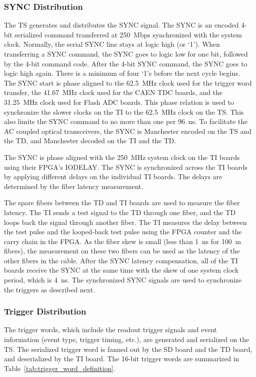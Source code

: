 \subsubsection{SYNC Distribution}

The TS generates and distributes the SYNC signal.  The SYNC is an encoded 4-bit serialized command transferred at 250~Mbps synchronized with the system clock.  Normally, the serial SYNC line stays at logic high (or ‘1’).  When transferring a SYNC command, the SYNC goes to logic low for one bit, followed by the 4-bit command code.  After the 4-bit SYNC command, the SYNC goes to logic high again.  There is a minimum of four ‘1’s before the next cycle begins.  The SYNC start is phase aligned to the 62.5~MHz clock used for the trigger word transfer, the 41.67~MHz clock used for the CAEN TDC boards, and the 31.25~MHz clock used for Flash ADC boards.  This phase relation is used to synchronize the slower clocks on the TI to the 62.5~MHz clock on the TS.  This also limits the SYNC command to no more than one per 96~ns.  To facilitate the AC coupled optical transceivers, the SYNC is Manchester encoded on the TS and the TD, and Manchester decoded on the TI and the TD.

The SYNC is phase aligned with the 250~MHz system clock on the TI boards using their FPGA’s IODELAY.  The SYNC is synchronized across the TI boards by applying different delays on the individual TI boards.  The delays are determined by the fiber latency measurement.  

The spare fibers between the TD and TI boards are used to measure the fiber latency.  The TI sends a test signal to the TD through one fiber, and the TD loops back the signal through another fiber.  The TI measures the delay between the test pulse and the looped-back test pulse using the FPGA counter and the carry chain in the FPGA.  As the fiber skew is small (less than 1~ns for 100~m fibers), the measurement on these two fibers can be used as the latency of the other fibers in the cable.  After the SYNC latency compensation, all of the TI boards receive the SYNC at the same time with the skew of one system clock period, which is 4~ns.  The synchronized SYNC signals are used to synchronize the triggers as described next.


\subsubsection{Trigger Distribution}

The trigger words, which include the readout trigger signals and event information (event type, trigger timing, etc.), are generated and serialized on the TS.  The serialized trigger word is fanned out by the SD board and the TD board, and deserialized by the TI board.  The 16-bit trigger words are summarized in Table~\ref{tab:trigger_word_definition}.  


